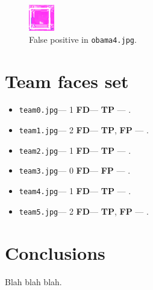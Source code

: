 \documentclass[11pt,a4paper,twocolumn]{article}
\begin{document}
\begin{figure}[htbp]
\centering
\includegraphics[width=0.1\textwidth]{false-positive.png}
\caption{False positive in \texttt{obama4.jpg}.\label{fig:false-positive}}
\end{figure}

\section*{Team faces set}
\begin{itemize}
\item \texttt{team0.jpg}--- 1 \textbf{FD}--- \textbf{TP} --- .
\item \texttt{team1.jpg}--- 2 \textbf{FD}--- \textbf{TP}, \textbf{FP} --- .
\item \texttt{team2.jpg}--- 1 \textbf{FD}--- \textbf{TP} --- .
\item \texttt{team3.jpg}--- 0 \textbf{FD}--- \textbf{FP} --- .
\item \texttt{team4.jpg}--- 1 \textbf{FD}--- \textbf{TP} --- .
\item \texttt{team5.jpg}--- 2 \textbf{FD}--- \textbf{TP}, \textbf{FP} --- .
\end{itemize}

\section*{Conclusions}
Blah blah blah.
\end{document}
